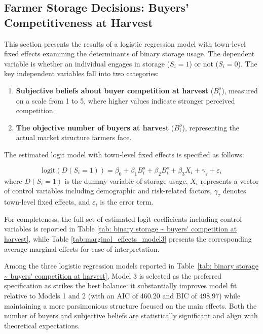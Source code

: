 \subsection{Farmer Storage Decisions: Buyers' Competitiveness at Harvest}
\noindent 
This section presents the results of a logistic regression model with town-level fixed effects examining the determinants of binary storage usage. The dependent variable is whether an individual engages in storage ($S_i = 1$) or not ($S_i = 0$). The key independent variables fall into two categories:  
\begin{enumerate}
    \item \textbf{Subjective beliefs about buyer competition at harvest} ($B^s_i$), measured on a scale from 1 to 5, where higher values indicate stronger perceived competition.  
    \item \textbf{The objective number of buyers at harvest} ($B^o_i$), representing the actual market structure farmers face. 
\end{enumerate}
The estimated logit model with town-level fixed effects is specified as follows:

\begin{equation}
\text{logit} \left( D(S_i= 1) \right) = \beta_0 + \beta_1 B^o_i + \beta_2 B^s_i + \beta_3 X_i + \gamma_\tau + \varepsilon_i
\label{Eq: empirical first one}
\end{equation}
where $D(S_i=1)$ is the dummy variable of storage usage, $X_i$ represents a vector of control variables including demographic and risk-related factors, $\gamma_\tau$ denotes town-level fixed effects, and $\varepsilon_i$ is the error term.  


For completeness, the full set of estimated logit coefficients including control variables is reported in Table \ref{tab: binary storage ~ buyers' competition at harvest}, while Table \ref{tab:marginal_effects_model3} presents the corresponding average marginal effects for ease of interpretation.  

Among the three logistic regression models reported in Table~\ref{tab: binary storage ~ buyers' competition at harvest}, Model 3 is selected as the preferred specification as strikes the best balance: it substantially improves model fit relative to Models 1 and 2 (with an AIC of 460.20 and BIC of 498.97) while maintaining a more parsimonious structure focused on the main effects. Both the number of buyers and subjective beliefs are statistically significant and align with theoretical expectations.

